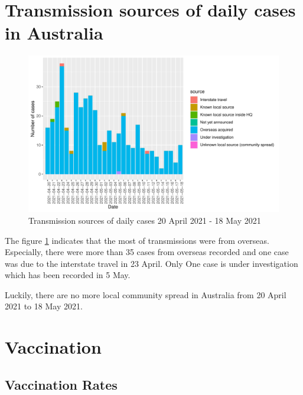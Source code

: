 \documentclass[11pt,a4paper,]{article}
\begin{document}
\section*{Transmission sources of daily cases in Australia}

\begin{figure}

{\centering \includegraphics{report_files/figure-latex/tra-1} 

}

\caption{Transmission sources of daily cases 20 April 2021 - 18 May 2021}\label{fig:tra}
\end{figure}

The figure \ref{fig:tra} indicates that the most of transmissions were from overseas. Especially, there were more than 35 cases from overseas recorded and one case was due to the interstate travel in 23 April. Only One case is under investigation which has been recorded in 5 May.

Luckily, there are no more local community spread in Australia from 20 April 2021 to 18 May 2021.

\section*{Vaccination}

\hypertarget{vaccination-rates}{%
\subsection{Vaccination Rates}\label{vaccination-rates}}
\end{document}
